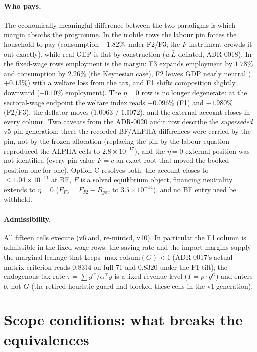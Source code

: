 \documentclass[11pt]{article}
\numberwithin{equation}{section}
\newcommand{\Lbar}{\bar{L}}
\begin{document}
\paragraph{Who pays.} The economically meaningful difference between the
two paradigms is which margin absorbs the programme. In the mobile rows the
labour pin forces the household to pay (consumption $-1.82\%$ under F2/F3;
the $F$ instrument crowds it out exactly), while real GDP is flat by
construction ($w\,\Lbar$ deflated, ADR-0018). In the fixed-wage rows
employment is the margin: F3 expands employment by $1.78\%$ and consumption
by $2.26\%$ (the Keynesian case), F2 leaves GDP nearly neutral
($+0.13\%$) with a welfare loss from the tax, and F1 shifts composition
slightly downward ($-0.10\%$ employment). \textcolor{revisionV1}{The
$\eta = 0$ row is no longer degenerate: at the sectoral-wage endpoint the
welfare index reads $+0.096\%$ (F1) and $-1.980\%$ (F2/F3), the deflator
moves ($1.0063$ / $1.0072$), and the external account closes in every
column. Two caveats from the ADR-0020 audit now describe the
\emph{superseded} v5 pin generation: there the recorded BF/ALPHA
differences were carried by the pin, not by the frozen allocation
(replacing the pin by the labour equation reproduced the ALPHA cells to
$2.8\times10^{-17}$), and the $\eta = 0$ external position was not
identified (every pin value $F = c$ an exact root that moved the booked
position one-for-one). Option C resolves both: the account closes to
$\le 1.04\times10^{-11}$ at BF, $F$ is a solved equilibrium object,
financing neutrality extends to $\eta = 0$ ($F_{F3} = F_{F2} - B_{gov}$ to
$3.5\times10^{-14}$), and no BF entry need be withheld.}

\paragraph{Admissibility.} All fifteen cells execute
\textcolor{revisionV3}{(v6 and, re-minted, v10)}. In particular the F1 column is
admissible in the fixed-wage
rows: \textcolor{revisionV3}{the saving rate and the import margins supply the
marginal leakage that keeps $\max \mathrm{colsum}(G) < 1$ (ADR-0017's
actual-matrix criterion reads $0.8314$ on full-71 and $0.8320$ under the F1
tilt); the endogenous tax rate $\tau = \sum g^G/\alpha^{\!\top}y$ is a
fixed-revenue level ($T = p\!\cdot\!g^G$) and enters $b$, not $G$} (the retired heuristic guard had blocked these
cells in the v1 generation).

\section{Scope conditions: what breaks the equivalences}\label{sec:scope}
\end{document}
